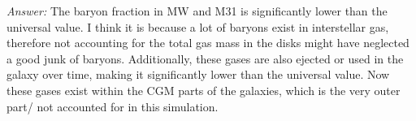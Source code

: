 \documentclass{article}
\begin{document}
\begin{enumerate}
    \textit{Answer:} The baryon fraction in MW and M31 is significantly lower than the universal value. I think it is because a lot of baryons exist in interstellar gas, therefore not accounting for the total gas mass in the disks might have neglected a good junk of baryons. Additionally, these gases are also ejected or used in the galaxy over time, making it significantly lower than the universal value. Now these gases exist within the CGM parts of the galaxies, which is the very outer part/ not accounted for in this simulation. 

\end{enumerate}
\end{document}
